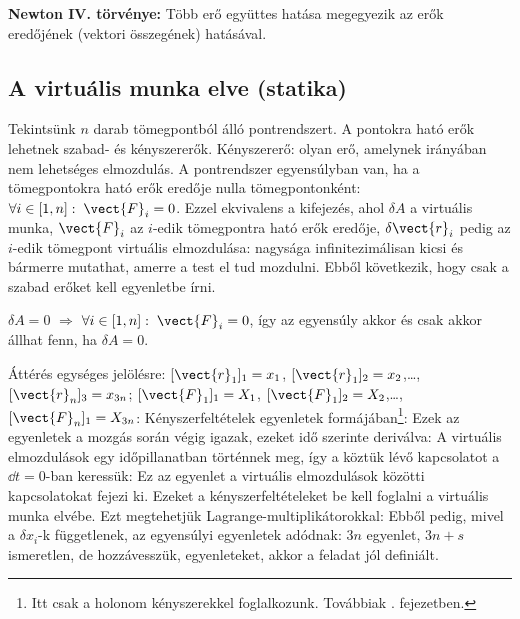    {\bf Newton IV. törvénye:} Több erő együttes hatása megegyezik az erők eredőjének (vektori összegének) hatásával. 
   
  \subsection{A virtuális munka elve (statika)}
   
   Tekintsünk $n$ darab tömegpontból álló pontrendszert.
   A pontokra ható erők lehetnek szabad- és kényszererők.
   Kényszererő: olyan erő, amelynek irányában nem lehetséges elmozdulás.
   A pontrendszer egyensúlyban van, ha a tömegpontokra ható erők eredője nulla tömegpontonként: $\forall i\in [1,n]:\; \vect{F}_i=0$.
   Ezzel ekvivalens a 
   kifejezés, ahol $\delta A$ a virtuális munka, $\vect{F}_i$ az $i$-edik tömegpontra ható erők eredője, $\delta\vect{r}_i$ pedig az $i$-edik tömegpont virtuális elmozdulása: nagysága infinitezimálisan kicsi és bármerre mutathat, amerre a test el tud mozdulni.
   Ebből következik, hogy csak a szabad erőket kell  egyenletbe írni. 
   
   $\delta A=0$ $\Rightarrow$ $\forall i\in [1,n]:\; \vect{F}_i=0$, így az egyensúly akkor és csak akkor állhat fenn, ha $\delta A=0$.
   
   Áttérés egységes jelölésre: $[\vect{r}_1]_1=x_1$, $[\vect{r}_1]_2=x_2$,\dots,$[\vect{r}_n]_3=x_{3n}$; $[\vect{F}_1]_1=X_1$, $[\vect{F}_1]_2=X_2$,\dots, $[\vect{F}_n]_1=X_{3n}$:
   Kényszerfeltételek egyenletek formájában\footnote{Itt csak a holonom kényszerekkel foglalkozunk.
   Továbbiak . fejezetben.}: 
   Ezek az egyenletek a mozgás során végig igazak, ezeket idő szerinte deriválva:
   A virtuális elmozdulások egy időpillanatban történnek meg, így a köztük lévő kapcsolatot a $\dd t=0$-ban keressük:
   Ez az egyenlet a virtuális elmozdulások közötti kapcsolatokat fejezi ki.  Ezeket a kényszerfeltételeket be kell foglalni a virtuális munka elvébe.
   Ezt megtehetjük Lagrange-multiplikátorokkal: 
   Ebből pedig, mivel a $\delta x_i$-k függetlenek, az egyensúlyi egyenletek adódnak:
   $3n$ egyenlet, $3n+s$ ismeretlen, de hozzávesszük,  egyenleteket, akkor a feladat jól definiált. 
  
